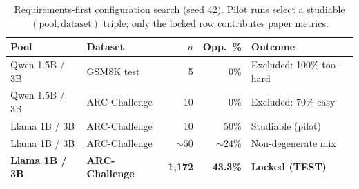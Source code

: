 \begin{table}[t]
  \centering
  \small
  \begin{tabular}{llrrl}
    \toprule
    \textbf{Pool} & \textbf{Dataset} & $n$ & Opp.\ \% & \textbf{Outcome} \\
    \midrule
    Qwen 1.5B / 3B & GSM8K test & 5 & 0\% & Excluded: 100\% too-hard \\
    Qwen 1.5B / 3B & ARC-Challenge & 10 & 0\% & Excluded: 70\% easy \\
    Llama 1B / 3B & ARC-Challenge & 10 & 50\% & Studiable (pilot) \\
    Llama 1B / 3B & ARC-Challenge & ${\sim}50$ & ${\sim}24$\% & Non-degenerate mix \\
    \textbf{Llama 1B / 3B} & \textbf{ARC-Challenge} & \textbf{1{,}172} & \textbf{43.3\%} & \textbf{Locked (TEST)} \\
    \bottomrule
  \end{tabular}
  \caption{Requirements-first configuration search (seed 42). Pilot runs select a studiable $(\text{pool}, \text{dataset})$ triple; only the locked row contributes paper metrics.}
  \label{tab:config-screen}
\end{table}
